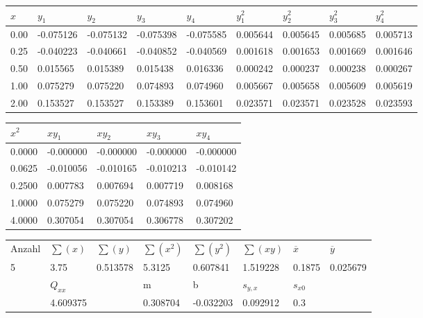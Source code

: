 \documentclass[10pt]{article}
\begin{document}
\begin{table}[ht!]
  \centering
 \begin{tabularx}{\textwidth}{lllllllll}
$x$ & $y_1$ & $y_2$ &$y_3$ & $y_4$ & $y_1^2$ & $y_2^2$ & $y_3^2$ &$y_4^2$  \\
\hline
0.00 &-0.075126 & -0.075132 &  -0.075398 & -0.075585 &0.005644 &0.005645 &0.005685 & 0.005713 \\
0.25 &-0.040223 & -0.040661 &  -0.040852 & -0.040569 &0.001618 &0.001653 &0.001669 & 0.001646 \\
0.50 &0.015565  & 0.015389  &  0.015438  &  0.016336 &0.000242 &0.000237 &0.000238 & 0.000267 \\
1.00 &0.075279  & 0.075220  &  0.074893  &  0.074960 &0.005667 &0.005658 &0.005609 & 0.005619 \\
2.00 &0.153527  & 0.153527  &  0.153389  &  0.153601 &0.023571 &0.023571 &0.023528 & 0.023593 \\
\end{tabularx}
   \renewcommand\thetable{2}
\end{table}

\begin{table}[ht!]
  \centering
 \begin{tabularx}{\textwidth}{XXXXX}
$x^2$ & $xy_1$ & $xy_2$ &$xy_3$ &$xy_4$\\
\hline
  0.0000& -0.000000 & -0.000000& -0.000000 &-0.000000\\
  0.0625& -0.010056 & -0.010165& -0.010213 &-0.010142\\
  0.2500& 0.007783  & 0.007694  &  0.007719 &0.008168 \\
  1.0000& 0.075279  & 0.075220  &  0.074893 &0.074960 \\
  4.0000& 0.307054  & 0.307054  &  0.306778 &0.307202 \\
\end{tabularx}
   \renewcommand\thetable{2}
\end{table}
\begin{table}[ht!]
  \centering
 \begin{tabularx}{\textwidth}{XXXXXXXX}
Anzahl & $\sum(x)$ & $\sum(y)$ &$\sum(x^2)$ & $\sum(y^2)$ & $\sum(xy)$ &   $\overline x$ & $\overline y$ \\
 5 & 3.75 & 0.513578 & 5.3125 & 0.607841 & 1.519228 &  0.1875 & 0.025679 \\
\hline
  & $Q_{xx}$&  & m & b & $s_{y,x}$ & $s_{x0}$&  \\
 & 4.609375 & & 0.308704 & -0.032203 & 0.092912 & 0.3&  \\

\end{tabularx}
   \renewcommand\thetable{2}
\end{table}
\end{document}

